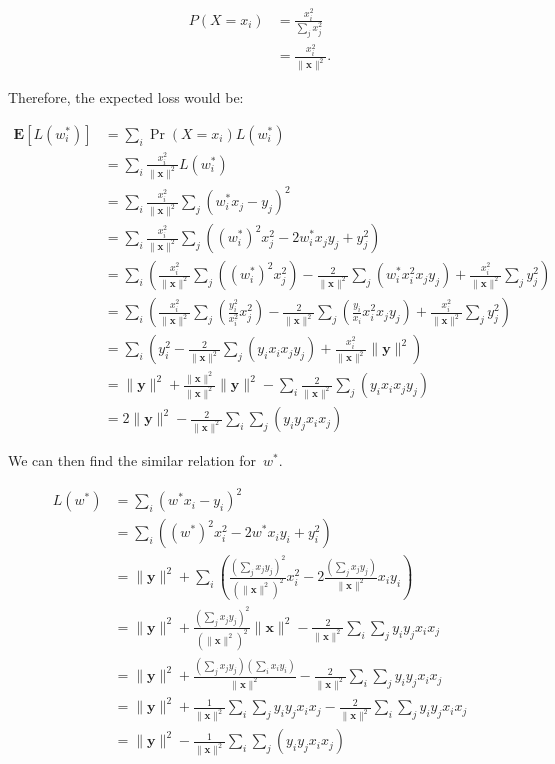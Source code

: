 \documentclass{report}
\newcommand{\norm}[1]{\lVert\mathbf{#1}\rVert^{2}}
\begin{document}
  \begin{align}
    P(X=x_{i})&=\frac{x_{i}^{2}}{\sum_{j} x_{j}^{2}}\\
    &=\frac{x_{i}^{2}}{\norm{x}}\textrm{.}
  \end{align}

  Therefore, the expected loss would be:
  
  \begin{align}
    \mathbf{E}\left[ L(w_{i}^{*}) \right] &= \sum_{i} \Pr(X=x_i)L(w_{i}^{*})\\
    &= \sum_{i} \frac{x_{i}^2}{\norm{x}}L(w_{i}^{*})\\
    &= \sum_{i} \frac{x_{i}^2}{\norm{x}}\sum_{j} (w_{i}^{*} x_{j}-y_{j})^{2}\\
    &= \sum_{i} \frac{x_{i}^2}{\norm{x}}\sum_{j} \left( \left(w_{i}^{*}\right)^{2}x^{2}_{j}-2w_{i}^{*}x_{j}y_{j}+y^{2}_{j}\right)\\
    &= \sum_{i} \left(  \frac{x_{i}^2}{\norm{x}}\sum_{j} \left( \left(w_{i}^{*}\right)^{2}x^{2}_{j}\right)-\frac{2}{\norm{x}}\sum_{j}\left(w_{i}^{*}x_{i}^{2}x_{j}y_{j}\right) +\frac{x_{i}^2}{\norm{x}}\sum_{j} y^{2}_{j} \right)\\
    &= \sum_{i} \left(  \frac{x_{i}^2}{\norm{x}}\sum_{j} \left( \frac{y^{2}_{i}}{x^{2}_{i}}x^{2}_{j}\right) -  \frac{2}{\norm{x}}\sum_{j}\left(\frac{y_{i}}{x_{i}}x_{i}^{2}x_{j}y_{j}\right)   +\frac{x_{i}^2}{\norm{x}}\sum_{j} y^{2}_{j} \right)\\
    &= \sum_{i} \left(  y^{2}_{i}- \frac{2}{\norm{x}}\sum_{j}\left(y_{i}x_{i}x_{j}y_{j}\right) +\frac{x_{i}^2}{\norm{x}}\norm{y} \right)\\
    &= \norm{y} +\frac{\norm{x}}{\norm{x}}\norm{y} -\sum_{i}\frac{2}{\norm{x}}\sum_{j}\left(y_{i}x_{i}x_{j}y_{j}\right) \\
    &= 2\norm{y} - \frac{2}{\norm{x}}\sum_{i}\sum_{j}\left(y_{i}y_{j}x_{i}x_{j}\right)\label{eq:expectedLoss}
  \end{align}
  
  We can then find the similar relation for~$w^{*}$.
  
  \begin{align}
    L(w^{*}) &= \sum_{i} (w^{*} x_{i}-y_{i})^2\\
    &= \sum_{i} \left( \left(w^{*}\right)^{2}x_{i}^{2}-2w^{*}x_{i}y_{i}+y^{2}_{i}\right)\\
    &= \norm{y} + \sum_{i} \left( \frac{\left(\sum_{j}x_{j}y_{j}\right)^{2}}{\left(\norm{x}\right)^2}x_{i}^{2}-2\frac{\left(\sum_{j}x_{j}y_{j}\right)}{\norm{x}}x_{i}y_{i}\right)\\
    &= \norm{y} +\frac{\left(\sum_{j}x_{j}y_{j}\right)^{2}}{\left(\norm{x}\right)^2}\norm{x} -\frac{2}{\norm{x}}\sum_{i}\sum_{j}y_{i}y_{j}x_{i}x_{j}\\
    &= \norm{y} +\frac{(\sum_{j}x_{j}y_{j})(\sum_{i}x_{i}y_{i})}{\norm{x}} -\frac{2}{\norm{x}}\sum_{i}\sum_{j}y_{i}y_{j}x_{i}x_{j}\\
    &= \norm{y} + \frac{1}{\norm{x}}\sum_{i}\sum_{j}y_{i}y_{j}x_{i}x_{j}-\frac{2}{\norm{x}}\sum_{i}\sum_{j}y_{i}y_{j}x_{i}x_{j}\\
    &= \norm{y} - \frac{1}{\norm{x}}\sum_{i}\sum_{j}\left(y_{i}y_{j}x_{i}x_{j}\right)\label{eq:optimalLoss}
  \end{align}
  
\end{document}

